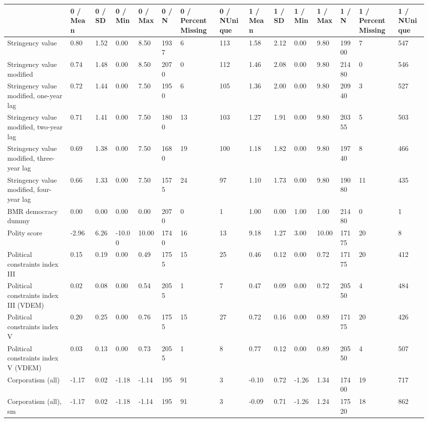 
\begin{longtable}{lllllllllllllll}
\toprule
  & 0 / Mean & 0 / SD & 0 / Min & 0 / Max & 0 / N & 0 / PercentMissing & 0 / NUnique & 1 / Mean & 1 / SD & 1 / Min & 1 / Max & 1 / N & 1 / PercentMissing & 1 / NUnique\\
\midrule
Stringency value & 0.80 & 1.52 & 0.00 & 8.50 & 1937 & 6 & 113 & 1.58 & 2.12 & 0.00 & 9.80 & 19900 & 7 & 547\\
Stringency value modified & 0.74 & 1.48 & 0.00 & 8.50 & 2070 & 0 & 112 & 1.46 & 2.08 & 0.00 & 9.80 & 21480 & 0 & 546\\
Stringency value modified, one-year lag & 0.72 & 1.44 & 0.00 & 7.50 & 1950 & 6 & 105 & 1.36 & 2.00 & 0.00 & 9.80 & 20940 & 3 & 527\\
Stringency value modified, two-year lag & 0.71 & 1.41 & 0.00 & 7.50 & 1800 & 13 & 103 & 1.27 & 1.91 & 0.00 & 9.80 & 20355 & 5 & 503\\
Stringency value modified, three-year lag & 0.69 & 1.38 & 0.00 & 7.50 & 1680 & 19 & 100 & 1.18 & 1.82 & 0.00 & 9.80 & 19740 & 8 & 466\\
\addlinespace
Stringency value modified, four-year lag & 0.66 & 1.33 & 0.00 & 7.50 & 1575 & 24 & 97 & 1.10 & 1.73 & 0.00 & 9.80 & 19080 & 11 & 435\\
BMR democracy dummy & 0.00 & 0.00 & 0.00 & 0.00 & 2070 & 0 & 1 & 1.00 & 0.00 & 1.00 & 1.00 & 21480 & 0 & 1\\
Polity score & -2.96 & 6.26 & -10.00 & 10.00 & 1740 & 16 & 13 & 9.18 & 1.27 & 3.00 & 10.00 & 17175 & 20 & 8\\
Political constraints index III & 0.15 & 0.19 & 0.00 & 0.49 & 1755 & 15 & 25 & 0.46 & 0.12 & 0.00 & 0.72 & 17175 & 20 & 412\\
Political constraints index III (VDEM) & 0.02 & 0.08 & 0.00 & 0.54 & 2055 & 1 & 7 & 0.47 & 0.09 & 0.00 & 0.72 & 20550 & 4 & 484\\
\addlinespace
Political constraints index V & 0.20 & 0.25 & 0.00 & 0.76 & 1755 & 15 & 27 & 0.72 & 0.16 & 0.00 & 0.89 & 17175 & 20 & 426\\
Political constraints index V (VDEM) & 0.03 & 0.13 & 0.00 & 0.73 & 2055 & 1 & 8 & 0.77 & 0.12 & 0.00 & 0.89 & 20550 & 4 & 507\\
Corporatism (all) & -1.17 & 0.02 & -1.18 & -1.14 & 195 & 91 & 3 & -0.10 & 0.72 & -1.26 & 1.34 & 17400 & 19 & 717\\
Corporatism (all), sm & -1.17 & 0.02 & -1.18 & -1.14 & 195 & 91 & 3 & -0.09 & 0.71 & -1.26 & 1.24 & 17520 & 18 & 862\\

\end{longtable}
